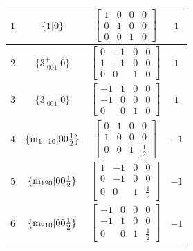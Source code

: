 \documentclass[fleqn,8pt]{jsarticle}
\begin{document}
\begin{longtable}{cccc}
$ 1 $ & $ \{1|0\} $ & $ \begin{bmatrix} 1 & 0 & 0 & 0 \\ 0 & 1 & 0 & 0 \\ 0 & 0 & 1 & 0 \end{bmatrix} $ & $ 1 $ \\ \hline
$ 2 $ & $ \{3^{+}_{\,\,001}|0\} $ & $ \begin{bmatrix} 0 & -1 & 0 & 0 \\ 1 & -1 & 0 & 0 \\ 0 & 0 & 1 & 0 \end{bmatrix} $ & $ 1 $ \\ \hline
$ 3 $ & $ \{3^{-}_{\,\,001}|0\} $ & $ \begin{bmatrix} -1 & 1 & 0 & 0 \\ -1 & 0 & 0 & 0 \\ 0 & 0 & 1 & 0 \end{bmatrix} $ & $ 1 $ \\ \hline
$ 4 $ & $ \{{\rm m}_{1-10}|0 0 \frac{1}{2}\} $ & $ \begin{bmatrix} 0 & 1 & 0 & 0 \\ 1 & 0 & 0 & 0 \\ 0 & 0 & 1 & \frac{1}{2} \end{bmatrix} $ & $ -1 $ \\ \hline
$ 5 $ & $ \{{\rm m}_{120}|0 0 \frac{1}{2}\} $ & $ \begin{bmatrix} 1 & -1 & 0 & 0 \\ 0 & -1 & 0 & 0 \\ 0 & 0 & 1 & \frac{1}{2} \end{bmatrix} $ & $ -1 $ \\ \hline
$ 6 $ & $ \{{\rm m}_{210}|0 0 \frac{1}{2}\} $ & $ \begin{bmatrix} -1 & 0 & 0 & 0 \\ -1 & 1 & 0 & 0 \\ 0 & 0 & 1 & \frac{1}{2} \end{bmatrix} $ & $ -1 $ \\
\end{longtable}
\end{document}
